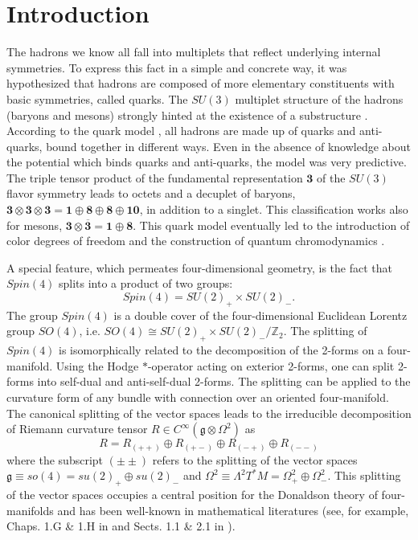 \documentclass[12pt,epsf]{article}
\begin{document}
\renewcommand{\thefootnote}{\arabic{footnote}}
\setcounter{footnote}{0}



\section{Introduction}


The hadrons we know all fall into multiplets that reflect underlying internal symmetries.
To express this fact in a simple and concrete way, it was hypothesized that hadrons are composed of
more elementary constituents with basic symmetries, called quarks.
The $SU(3)$ multiplet structure of the hadrons (baryons and mesons) strongly hinted
at the existence of a substructure \cite{gell-mann1962,penn4}. According to the quark model \cite{gell-mann1964},
all hadrons are made up of quarks and anti-quarks, bound together in different ways.
Even in the absence of knowledge about the potential which binds quarks and anti-quarks,
the model was very predictive. The triple tensor product of the fundamental representation $\mathbf{3}$ of
the $SU(3)$ flavor symmetry leads to octets and a decuplet of baryons, $\mathbf{3} \otimes \mathbf{3} \otimes
\mathbf{3} = \mathbf{1} \oplus \mathbf{8} \oplus \mathbf{8} \oplus \mathbf{10}$, in addition to a singlet.
This classification works also for mesons, $\mathbf{3} \otimes \overline{\mathbf{3}}
= \mathbf{1} \oplus \mathbf{8}$.
This quark model eventually led to the introduction of color degrees of freedom and the construction
of quantum chromodynamics \cite{color1,color2}.




A special feature, which permeates four-dimensional geometry, is the fact that $Spin(4)$ splits
into a product of two groups:
\begin{equation}\label{spin4-split}
  Spin(4) = SU(2)_+ \times SU(2)_-.
\end{equation}
The group $Spin(4)$ is a double cover of the four-dimensional Euclidean Lorentz group $SO(4)$,
i.e. $SO(4)\cong SU(2)_+ \times SU(2)_-/\mathbb{Z}_2$.
The splitting of $Spin(4)$ is isomorphically related to the decomposition of the 2-forms on a four-manifold.
Using the Hodge $*$-operator acting on exterior 2-forms, one can split 2-forms into self-dual and anti-self-dual 2-forms.
The splitting can be applied to the curvature form of any bundle with connection over an oriented four-manifold.
The canonical splitting of the vector spaces leads to the irreducible decomposition of
Riemann curvature tensor $R \in C^\infty ( \mathfrak{g} \otimes \Omega^2)$ as \cite{s-duality}
\begin{equation}\label{riem-irrdec}
  R = R_{(++)} \oplus  R_{(+-)} \oplus R_{(-+)} \oplus R_{(--)}
\end{equation}
where the subscript $(\pm \pm)$ refers to the splitting of the vector spaces
$\mathfrak{g} \equiv so(4) = su(2)_+ \oplus su(2)_-$ and $\Omega^2 \equiv \Lambda^2 T^* M = \Omega^2_+ \oplus \Omega^2_-$.
This splitting of the vector spaces occupies a central position for the Donaldson theory of four-manifolds and
has been well-known in mathematical literatures (see, for example, Chaps. 1.G \& 1.H in \cite{book-besse} and
Sects. 1.1 \& 2.1 in \cite{book-dokr}).
\end{document}
